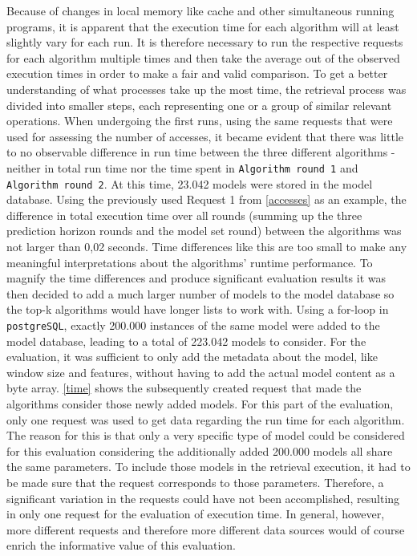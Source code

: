 Because of changes in local memory like cache and other simultaneous running programs, it is apparent that the execution time for each algorithm will at least slightly vary for each run. It is therefore necessary to run the respective requests for each algorithm multiple times and then take the average out of the observed execution times in order to make a fair and valid comparison. To get a better understanding of what processes take up the most time, the retrieval process was divided into smaller steps, each representing one or a group of similar relevant operations. When undergoing the first runs, using the same requests that were used for assessing the number of accesses, it became evident that there was little to no observable difference in run time between the three different algorithms - neither in total run time nor the time spent in \texttt{Algorithm round 1} and \texttt{Algorithm round 2}. At this time, 23.042 models were stored in the model database. Using the previously used Request 1 from \autoref{accesses} as an example, the difference in total execution time over all rounds (summing up the three prediction horizon rounds and the model set round) between the algorithms was not larger than 0,02 seconds. Time differences like this are too small to make any meaningful interpretations about the algorithms' runtime performance. To magnify the time differences and produce significant evaluation results it was then decided to add a much larger number of models to the model database so the top-k algorithms would have longer lists to work with. Using a for-loop in \texttt{postgreSQL}, exactly 200.000 instances of the same model were added to the model database, leading to a total of 223.042 models to consider. For the evaluation, it was sufficient to only add the metadata about the model, like window size and features, without having to add the actual model content as a byte array. \autoref{time} shows the subsequently created request that made the algorithms consider those newly added models. For this part of the evaluation, only one request was used to get data regarding the run time for each algorithm. The reason for this is that only a very specific type of model could be considered for this evaluation considering the additionally added 200.000 models all share the same parameters. To include those models in the retrieval execution, it had to be made sure that the request corresponds to those parameters. Therefore, a significant variation in the requests could have not been accomplished, resulting in only one request for the evaluation of execution time. In general, however, more different requests and therefore more different data sources would of course enrich the informative value of this evaluation.



